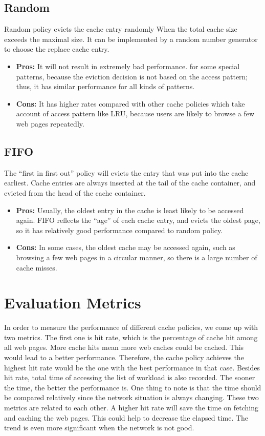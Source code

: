 \documentclass[paper=a4, fontsize=11pt]{scrartcl} %
\numberwithin{equation}{section} %
\numberwithin{figure}{section} %
\numberwithin{table}{section} %
\begin{document}
\subsection{Random}
Random policy evicts the cache entry randomly When the total cache 
size exceeds the maximal size. It can be implemented by a random
number generator to choose the replace cache entry.
\begin{itemize}
\item \textbf{Pros:} It will not result in extremely bad performance.
for some special
 patterns, because the eviction decision is not based on the 
access pattern; thus, it has similar performance for all kinds of patterns.
\item \textbf{Cons:} It has higher rates compared with other cache 
policies which take account of access pattern like LRU, because users
are likely to browse a few web pages repeatedly.
\end{itemize}

\subsection{FIFO}
The ``first in first out'' policy will evicts the entry that was put 
into the cache earliest. Cache entries are always inserted at the tail
of the cache container, and evicted from the head of the cache container.
\begin{itemize}
\item \textbf{Pros:} Usually, the oldest entry in the cache is least
likely to be accessed again. FIFO reflects the ``age'' of each cache entry, 
and evicts the oldest page, so it has relatively good performance compared
to random policy.
\item \textbf{Cons:} In some cases, the oldest cache may be accessed again,
such as browsing a few web pages in a circular manner, so there is a large 
number of cache misses. 
\end{itemize}

\section{Evaluation Metrics}

In order to measure the performance of different cache policies, we come up with two metrics. The first one is hit rate, which is the percentage of cache hit among all web pages. More cache hits mean more web caches could be cached. This would lead to a better performance. Therefore, the cache policy achieves the highest hit rate would be the one with the best performance in that case. Besides hit rate, total time of accessing the list of workload is also recorded. The sooner the time, the better the performance is. One thing to note is that the time should be compared relatively since the network situation is always changing. These two metrics are related to each other. A higher hit rate will save the time on fetching and caching the web pages. This could help to decrease the elapsed time. The trend is even more significant when the network is not good. 
\end{document}
